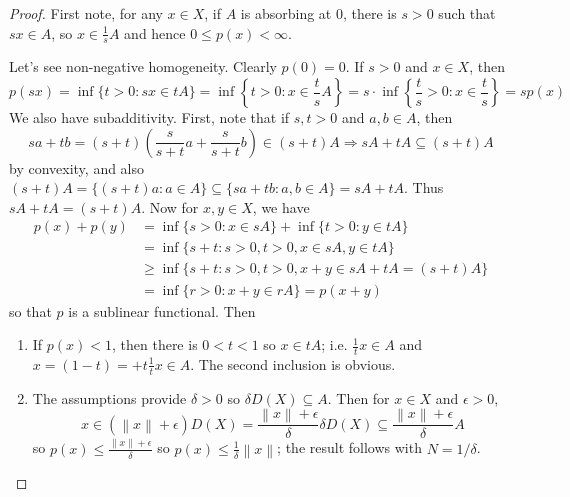 \documentclass[11pt, a4paper]{memoir}
\newcommand{\norm}[1]{\ensuremath{\left\lVert#1\right\rVert}}
\theoremstyle{change}
\theoremstyle{plain}
\theoremstyle{nonumberplain}
\newtheorem{proof}{Proof}
\numberwithin{equation}{section}
\begin{document}
\begin{proof}
    First note, for any $x\in X$, if $A$ is absorbing at $0$, there is $s>0$ such that $sx\in A$, so $x\in \frac{1}{s} A$ and hence $0\leq p(x)<\infty$.

    Let's see non-negative homogeneity.
    Clearly $p(0)=0$.
    If $s>0$ and $x\in X$, then
    \begin{equation*}
        p(sx)=\inf\{t>0:sx\in tA\}=\inf\left\{t>0:x\in\frac{t}{s}A\right\}=s\cdot\inf\left\{\frac{t}{s}>0:x\in\frac{t}{s}\right\}=sp(x)
    \end{equation*}
    We also have subadditivity.
    First, note that if $s,t>0$ and $a,b\in A$, then
    \begin{equation*}
        sa+tb=(s+t)\left(\frac{s}{s+t}a+\frac{s}{s+t}b\right)\in(s+t)A\Longrightarrow sA+tA\subseteq(s+t)A
    \end{equation*}
    by convexity, and also $(s+t)A=\{(s+t)a:a\in A\}\subseteq\{sa+tb:a,b\in A\}=sA+tA$.
    Thus $sA+tA=(s+t)A$.
    Now for $x,y\in X$, we have
    \begin{align*}
        p(x)+p(y) &= \inf\{s>0:x\in sA\}+\inf\{t>0:y\in tA\}\\
                  &= \inf\{s+t:s>0,t>0,x\in sA,y\in tA\}\\
                  &\geq\inf\{s+t:s>0,t>0,x+y\in sA+tA=(s+t)A\}\\
                  &= \inf\{r>0:x+y\in rA\}=p(x+y)
    \end{align*}
    so that $p$ is a sublinear functional.
    Then
    \begin{enumerate}[nl,r]
        \item If $p(x)<1$, then there is $0<t<1$ so $x\in tA$; i.e. $\frac{1}{t}x\in A$ and $x=(1-t)=+t\frac{1}{t}x\in A$.
            The second inclusion is obvious.
        \item The assumptions provide $\delta>0$ so $\delta D(X)\subseteq A$.
            Then for $x\in X$ and $\epsilon>0$,
            \begin{equation*}
                x\in(\norm{x}+\epsilon)D(X)=\frac{\norm{x}+\epsilon}{\delta}\delta D(X)\subseteq\frac{\norm{x}+\epsilon}{\delta}A
            \end{equation*}
            so $p(x)\leq\frac{\norm{x}+\epsilon}{\delta}$ so $p(x)\leq\frac{1}{\delta}\norm{x}$; the result follows with $N=1/\delta$.
    \end{enumerate}
\end{proof}
\end{document}
